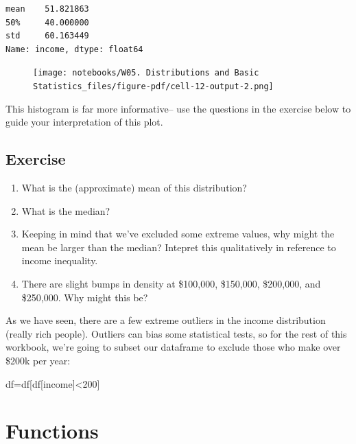 \documentclass[
  letterpaper,
  DIV=11,
  numbers=noendperiod]{scrreprt}
\newenvironment{Shaded}{\begin{snugshade}}{\end{snugshade}}
\newcommand{\DecValTok}[1]{\textcolor[rgb]{0.68,0.00,0.00}{#1}}
\newcommand{\NormalTok}[1]{\textcolor[rgb]{0.00,0.23,0.31}{#1}}
\newcommand{\OperatorTok}[1]{\textcolor[rgb]{0.37,0.37,0.37}{#1}}
\newcommand{\StringTok}[1]{\textcolor[rgb]{0.13,0.47,0.30}{#1}}
\providecommand{\tightlist}{%
  \setlength{\itemsep}{0pt}\setlength{\parskip}{0pt}}\usepackage{longtable,booktabs,array}
\begin{document}
\begin{verbatim}
mean    51.821863
50%     40.000000
std     60.163449
Name: income, dtype: float64
\end{verbatim}

\begin{figure}[H]

{\centering \texttt{[image: notebooks/W05. Distributions and Basic Statistics\_files/figure-pdf/cell-12-output-2.png]}

}

\end{figure}

This histogram is far more informative-- use the questions in the
exercise below to guide your interpretation of this plot.

\hypertarget{exercise-12}{%
\subsection{Exercise}\label{exercise-12}}

\begin{enumerate}
\def\labelenumi{\arabic{enumi}.}
\tightlist
\item
  What is the (approximate) mean of this distribution?
\item
  What is the median?
\item
  Keeping in mind that we've excluded some extreme values, why might the
  mean be larger than the median? Intepret this qualitatively in
  reference to income inequality.
\item
  There are slight bumps in density at \$100,000, \$150,000, \$200,000,
  and \$250,000. Why might this be?
\end{enumerate}

As we have seen, there are a few extreme outliers in the income
distribution (really rich people). Outliers can bias some statistical
tests, so for the rest of this workbook, we're going to subset our
dataframe to exclude those who make over \$200k per year:

\begin{Shaded}
\begin{Highlighting}[]
\NormalTok{df}\OperatorTok{=}\NormalTok{df[df[}\StringTok{\textquotesingle{}income\textquotesingle{}}\NormalTok{]}\OperatorTok{\textless{}}\DecValTok{200}\NormalTok{]}
\end{Highlighting}
\end{Shaded}

\hypertarget{functions}{%
\section{Functions}\label{functions}}
\end{document}
